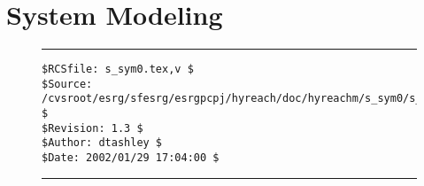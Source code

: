%
\section{System Modeling}
\label{ssym0}


\noindent\begin{figure}[!b]
\noindent\rule[-0.25in]{\textwidth}{1pt}
\begin{tiny}
\begin{verbatim}
$RCSfile: s_sym0.tex,v $
$Source: /cvsroot/esrg/sfesrg/esrgpcpj/hyreach/doc/hyreachm/s_sym0/s_sym0.tex,v $
$Revision: 1.3 $
$Author: dtashley $
$Date: 2002/01/29 17:04:00 $
\end{verbatim}
\end{tiny}
\noindent\rule[0.25in]{\textwidth}{1pt}
\end{figure}
%
%
%
